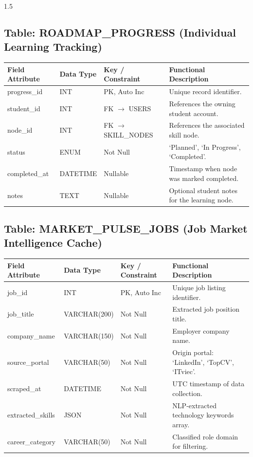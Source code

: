 \documentclass[12pt,a4paper]{report}
\begin{document}
\begin{spacing}{1.5}
		\subsection{Table: ROADMAP\_PROGRESS (Individual Learning Tracking)}
		
		\begin{tabular}{|p{3.5cm}|p{3.2cm}|p{2.5cm}|p{5.8cm}|}
			\hline
			\rowcolor{mainblue!10}\textbf{Field Attribute} & \textbf{Data Type} & \textbf{Key / Constraint} & \textbf{Functional Description} \\ \hline
			progress\_id & INT & PK, Auto Inc & Unique record identifier. \\ \hline
			student\_id & INT & FK $\to$ USERS & References the owning student account. \\ \hline
			node\_id & INT & FK $\to$ SKILL\_NODES & References the associated skill node. \\ \hline
			status & ENUM & Not Null & `Planned', `In Progress', `Completed'. \\ \hline
			completed\_at & DATETIME & Nullable & Timestamp when node was marked completed. \\ \hline
			notes & TEXT & Nullable & Optional student notes for the learning node. \\ \hline
		\end{tabular}
		
		\subsection{Table: MARKET\_PULSE\_JOBS (Job Market Intelligence Cache)}
		
		\begin{tabular}{|p{3.5cm}|p{3.2cm}|p{2.5cm}|p{5.8cm}|}
			\hline
			\rowcolor{mainblue!10}\textbf{Field Attribute} & \textbf{Data Type} & \textbf{Key / Constraint} & \textbf{Functional Description} \\ \hline
			job\_id & INT & PK, Auto Inc & Unique job listing identifier. \\ \hline
			job\_title & VARCHAR(200) & Not Null & Extracted job position title. \\ \hline
			company\_name & VARCHAR(150) & Not Null & Employer company name. \\ \hline
			source\_portal & VARCHAR(50) & Not Null & Origin portal: `LinkedIn', `TopCV', `ITviec'. \\ \hline
			scraped\_at & DATETIME & Not Null & UTC timestamp of data collection. \\ \hline
			extracted\_skills & JSON & Not Null & NLP-extracted technology keywords array. \\ \hline
			career\_category & VARCHAR(50) & Not Null & Classified role domain for filtering. \\ \hline
		\end{tabular}
		

\end{spacing}
\end{document}

